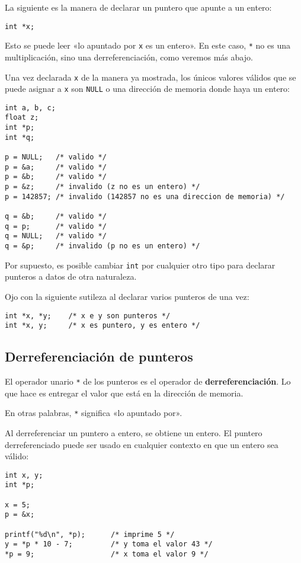 La siguiente es la manera de declarar un puntero que apunte a un entero:

\begin{lstlisting}
int *x;
\end{lstlisting}

Esto se puede leer «lo apuntado por \lstinline!x! es un entero». En este
caso, \lstinline!*! no es una multiplicación, sino una
derreferenciación, como veremos más abajo.

Una vez declarada \lstinline!x! de la manera ya mostrada, los únicos
valores válidos que se puede asignar a \lstinline!x! son
\lstinline!NULL! o una dirección de memoria donde haya un entero:

\begin{lstlisting}
int a, b, c;
float z;
int *p;
int *q;

p = NULL;   /* valido */
p = &a;     /* valido */
p = &b;     /* valido */
p = &z;     /* invalido (z no es un entero) */
p = 142857; /* invalido (142857 no es una direccion de memoria) */

q = &b;     /* valido */
q = p;      /* valido */
q = NULL;   /* valido */
q = &p;     /* invalido (p no es un entero) */
\end{lstlisting}

Por supuesto, es posible cambiar \lstinline!int! por cualquier otro tipo
para declarar punteros a datos de otra naturaleza.

Ojo con la siguiente sutileza al declarar varios punteros de una vez:

\begin{lstlisting}
int *x, *y;    /* x e y son punteros */
int *x, y;     /* x es puntero, y es entero */
\end{lstlisting}

\subsection{Derreferenciación de punteros}

El operador unario \lstinline!*! de los punteros es el operador de
\textbf{derreferenciación}. Lo que hace es entregar el valor que está en
la dirección de memoria.

En otras palabras, \lstinline!*! significa «lo apuntado por».

Al derreferenciar un puntero a entero, se obtiene un entero. El puntero
derreferenciado puede ser usado en cualquier contexto en que un entero
sea válido:

\begin{lstlisting}
int x, y;
int *p;

x = 5;
p = &x;

printf("%d\n", *p);      /* imprime 5 */
y = *p * 10 - 7;         /* y toma el valor 43 */
*p = 9;                  /* x toma el valor 9 */
\end{lstlisting}

